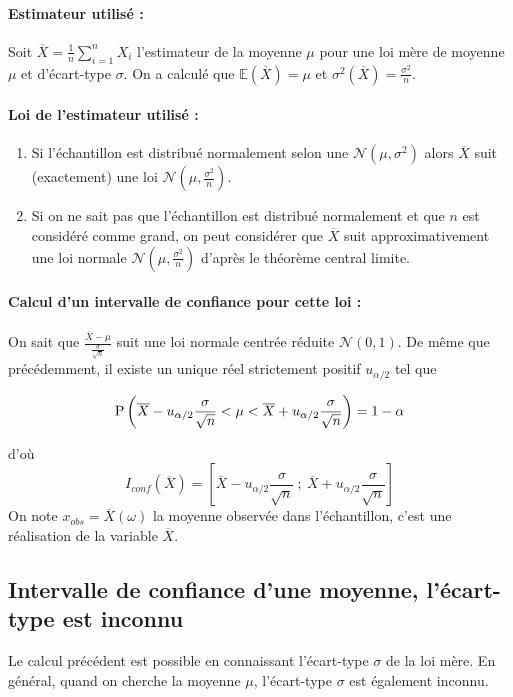 \paragraph{Estimateur utilisé :} Soit $\overline{X}=\frac{1}{n}\sum_{i=1}^n X_i$ l'estimateur de la moyenne $\mu$ pour une loi mère de moyenne $\mu$ et d'écart-type $\sigma$. On a calculé que $\mathbb{E}(\overline{X})=\mu$
et $\sigma^2(\overline{X}) = \frac{\sigma^2}{n}$.

\paragraph{Loi de l'estimateur utilisé :}  

\begin{enumerate}
	\item Si l'échantillon est distribué normalement selon une $\mathcal{N}\left(\mu,\sigma^2\right)$ alors $\overline{X}$ suit (exactement) une loi $\mathcal{N}\left(\mu,\frac{\sigma^2}{n}\right)$.
	\item Si on ne sait pas que l'échantillon est distribué normalement et que $n$ est considéré comme grand, on peut considérer que $\overline{X}$ suit approximativement une loi normale $\mathcal{N}\left(\mu,\frac{\sigma^2}{n}\right)$ d'après le théorème central limite.
\end{enumerate}


\paragraph{Calcul d'un intervalle de confiance pour cette loi :}  On sait que $\frac{\overline{X}-\mu}{\frac{\sigma}{\sqrt{n}}}$ suit une loi normale centrée réduite $\mathcal{N}(0,1)$. De même que précédemment, il existe un unique réel strictement positif $u_{\alpha/2}$ tel que 

$$\operatorname{P}\left(\overline{X}-u_{\alpha/2} \frac{\sigma}{\sqrt{n}} < \mu < \overline{X} + u_{\alpha/2} \frac{\sigma}{\sqrt{n}}\right) = 1-\alpha$$

d'où $$I_{conf}(\overline{X})=\left[\overline{X}-u_{\alpha/2} \frac{\sigma}{\sqrt{n}}~;~\overline{X} + u_{\alpha/2} \frac{\sigma}{\sqrt{n}} \right]$$
On note $x_{obs}=\overline{X}(\omega)$ la moyenne observée dans l'échantillon, c'est une réalisation de la variable $\overline{X}$.

\subsection{Intervalle de confiance d'une moyenne, l'écart-type est inconnu}
Le calcul précédent est possible en connaissant l'écart-type $\sigma$ de la loi mère. En général, quand on cherche la moyenne $\mu$, l'écart-type $\sigma$ est également inconnu. 

